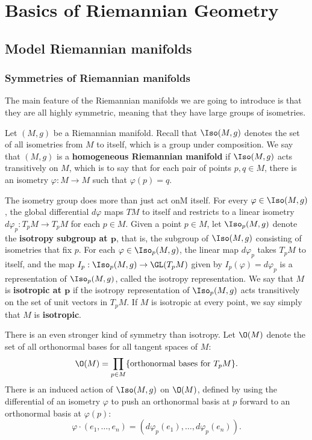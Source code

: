 \chapter{Basics of Riemannian Geometry}
\section{Model Riemannian manifolds}
\subsection{Symmetries of Riemannian manifolds}
The main feature of the Riemannian manifolds we are going to introduce is that they are all 
highly symmetric, meaning that they have large groups of isometries.\par
Let $(M,g)$ be a Riemannian manifold. Recall that $\Iso(M,g)$ denotes the set of all isometries 
from $M$ to itself, which is a group under composition. We say that $(M,g)$ is a 
\textbf{homogeneous Riemannian manifold} if $\Iso(M,g)$ acts transitively on $M$, which is 
to say that for each pair of points $p,q\in M$, there is an isometry $\varphi:M\to M$ such
that $\varphi(p)=q$.\par
The isometry group does more than just act onM itself. For every $\varphi\in\Iso(M,g)$, the 
global differential $d\varphi$ maps $TM$ to itself and restricts to a linear isometry 
$d\varphi_p:T_pM\to T_pM$ for each $p\in M$. Given a point $p\in M$, let $\Iso_p(M,g)$ 
denote the \textbf{isotropy subgroup at $\bm{p}$}, that is, the subgroup of $\Iso(M,g)$ 
consisting of isometries that fix $p$. For each $\varphi\in\Iso_p(M,g)$, the linear map $d\varphi_p$ 
takes $T_pM$ to itself, and the map $I_p:\Iso_p(M,g)\to\GL(T_pM)$ given by $I_p(\varphi)=d\varphi_p$ 
is a representation of $\Iso_p(M,g)$, called the isotropy representation. We say that $M$ is 
\textbf{isotropic at $\bm{p}$} if the isotropy representation of $\Iso_p(M,g)$ acts transitively 
on the set of unit vectors in $T_pM$. If $M$ is isotropic at every point, we say simply that $M$ 
is \textbf{isotropic}.\par
There is an even stronger kind of symmetry than isotropy. Let $\O(M)$ denote the set of all orthonormal bases for all tangent spaces of $M$:
\[\O(M)=\prod_{p\in M}\{\text{orthonormal bases for $T_pM$}\}.\]
There is an induced action of $\Iso(M,g)$ on $\O(M)$, defined by using the differential of an isometry $\varphi$ to push an orthonormal basis at $p$ forward to an orthonormal basis at $\varphi(p)$:
\[\varphi\cdot(e_1,\dots,e_n)=(d\varphi_p(e_1),\dots,d\varphi_p(e_n)).\]
